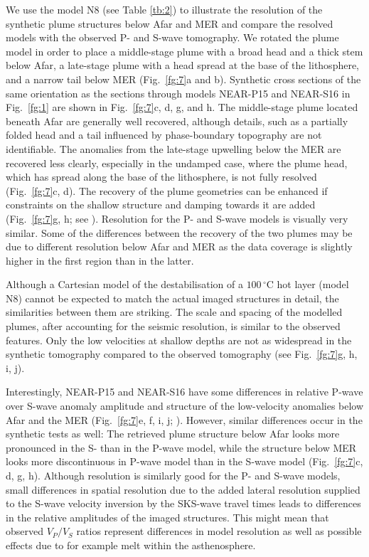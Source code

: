 \documentclass[a4paper,10pt,twocolumn]{paper}
\begin{document}
We use the model N8 (see Table \ref{tb:2}) to illustrate the resolution of the synthetic plume structures below Afar and MER and compare the resolved models with the observed P- and S-wave tomography. We rotated the plume model in order to place a middle-stage plume with a broad head and a thick stem below Afar, a late-stage plume with a head spread at the base of the lithosphere, and a narrow tail below MER (Fig.~\ref{fg:7}a and b). Synthetic cross sections of the same orientation as the sections through models NEAR-P15 and NEAR-S16 in Fig.~\ref{fg:1} are shown in Fig.~\ref{fg:7}c, d, g, and h. The middle-stage plume located beneath Afar are generally well recovered, although details, such as a partially folded head and a tail influenced by phase-boundary topography are not identifiable. The anomalies from the late-stage upwelling below the MER are recovered less clearly, especially in the undamped case, where the plume head, which has spread along the base of the lithosphere, is not fully resolved (Fig.~\ref{fg:7}c, d). The recovery of the plume geometries can be enhanced if constraints on the shallow structure and damping towards it are added (Fig.~\ref{fg:7}g, h; see \citealp{civiero-etal-2016,civiero-etal-2015}). Resolution for the P- and S-wave models is visually very similar. Some of the differences between the recovery of the two plumes may be due to different resolution below Afar and MER as the data coverage is slightly higher in the first region than in the latter.

Although a Cartesian model of the destabilisation of a $100\,^{\circ}$C hot layer (model N8) cannot be expected to match the actual imaged structures in detail, the similarities between them are striking. The scale and spacing of the modelled plumes, after accounting for the seismic resolution, is similar to the observed features. Only the low velocities at shallow depths are not as
widespread in the synthetic tomography compared to the observed tomography (see Fig.~\ref{fg:7}g, h, i, j).

Interestingly, NEAR-P15 and NEAR-S16 have some differences in relative P-wave over S-wave anomaly amplitude and structure of the low-velocity anomalies below Afar and the MER (Fig.~\ref{fg:7}e, f, i, j; \citealp{civiero-etal-2016}). However, similar differences occur in the synthetic tests as well: The retrieved plume structure below Afar looks more pronounced in the S- than in the P-wave model, while the structure below MER looks more discontinuous in P-wave model than in the S-wave model (Fig.~\ref{fg:7}c, d, g, h). Although resolution is similarly good for the P- and S-wave models, small differences in spatial resolution due to the added lateral resolution supplied to the S-wave velocity inversion by the SKS-wave travel times leads to differences in the relative amplitudes of the imaged structures. This might mean that observed $V_{P}/V_{S}$ ratios represent differences in model resolution as well as possible effects due to for example melt within the asthenosphere.
\end{document}
